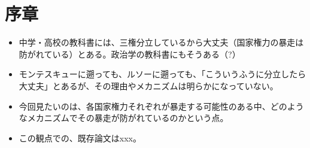 \documentclass[main.tex]{subfiles}
\begin{document}
\section*{序章}
\setcounter{page}{1}

\begin{itemize}
  \item 中学・高校の教科書には、三権分立しているから大丈夫（国家権力の暴走は防がれている）とある。政治学の教科書にもそうある（?）
  \item モンテスキューに遡っても、ルソーに遡っても、「こういうふうに分立したら大丈夫」とあるが、その理由やメカニズムは明らかになっていない。
  \item 今回見たいのは、各国家権力それぞれが暴走する可能性のある中、どのようなメカニズムでその暴走が防がれているのかという点。
  \item この観点での、既存論文はxxx。
\end{itemize}
\end{document}

